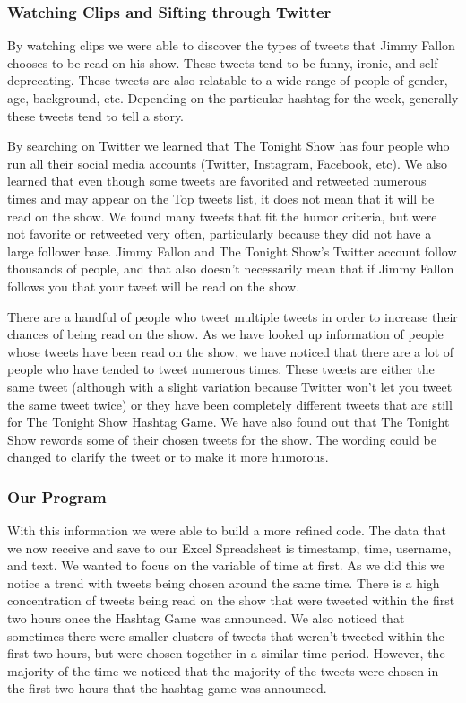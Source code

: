 \documentclass[titlepage]{article}
\begin{document}
\subsubsection{Watching Clips and Sifting through Twitter}

By watching clips we were able to discover the types of tweets that Jimmy Fallon chooses to be read on his show. These tweets tend to be funny, ironic, and self-deprecating. These tweets are also relatable to a wide range of people of gender, age, background, etc. Depending on the particular hashtag for the week, generally these tweets tend to tell a story. 

By searching on Twitter we learned that The Tonight Show has four people who run all their social media accounts (Twitter, Instagram, Facebook, etc). We also learned that even though some tweets are favorited and retweeted numerous times and may appear on the Top tweets list, it does not mean that it will be read on the show. We found many tweets that fit the humor criteria, but were not favorite or retweeted very often, particularly because they did not have a large follower base. Jimmy Fallon and The Tonight Show's Twitter account follow thousands of people, and that also doesn't necessarily mean that if Jimmy Fallon follows you that your tweet will be read on the show. 

There are a handful of people who tweet multiple tweets in order to increase their chances of being read on the show. As we have looked up information of people whose tweets have been read on the show, we have noticed that there are a lot of people who have tended to tweet numerous times. These tweets are either the same tweet (although with a slight variation because Twitter won't let you tweet the same tweet twice) or they have been completely different tweets that are still for The Tonight Show Hashtag Game. We have also found out that The Tonight Show rewords some of their chosen tweets for the show. The wording could be changed to clarify the tweet or to make it more humorous. 

\subsubsection{Our Program}

With this information we were able to build a more refined code. The data that we now receive and save to our Excel Spreadsheet is timestamp, time, username, and text. We wanted to focus on the variable of time at first. As we did this we notice a trend with tweets being chosen around the same time. There is a high concentration of tweets being read on the show that were tweeted within the first two hours once the Hashtag Game was announced. We also noticed that sometimes there were smaller clusters of tweets that weren't tweeted within the first two hours, but were chosen together in a similar time period. However, the majority of the time we noticed that the majority of the tweets were chosen in the first two hours that the hashtag game was announced. 
\end{document}
